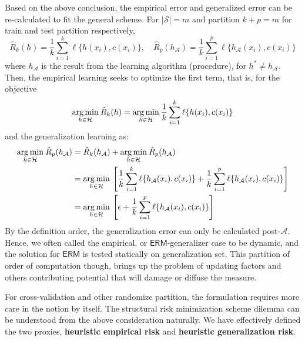 Based on the above conclusion, the empirical error and generalized error can be re-calculated to fit the general scheme. For $\lvert \mathcal{S}\rvert = m$ and partition $k+p=m$ for train and test partition respectively, 
\begin{equation}
    \hat{R}_{k}(h) = \frac{1}{k} \sum^{k}_{i=1} \ell\{h(x_{i}),c(x_{i})\},\quad \hat{R}_{p}(h_{\mathcal{A}}) = \frac{1}{k} \sum^{p}_{i=1} \ell\{h_{\mathcal{A}}(x_{i}),c(x_{i})\}
\end{equation}
where $h_{\mathcal{A}}$ is the result from the learning algorithm (procedure), for $h^{*}\neq h_{\mathcal{A}}$. Then, the empirical learning seeks to optimize the first term, that is, for the objective 
\begin{equation}
    \underset{h\in \mathcal{H}}{\operatorname*{arg\,min}}\: \hat{R}_{k}(h) = \underset{h\in \mathcal{H}}{\operatorname*{arg\,min}}\:\frac{1}{k} \sum^{k}_{i=1} \ell\{h(x_{i}),c(x_{i})\}
\end{equation}
and the generalization learning as: 
\begin{equation}
    \begin{split}
        \underset{h\in \mathcal{H}}{\operatorname*{arg\,min}}\: \hat{R}_{p}(h_{\mathcal{A}}) 
        & = \hat{R}_{k}(h_{\mathcal{A}}) + \underset{h\in \mathcal{H}}{\operatorname*{arg\,min}}\:\hat{R}_{p}(h_{\mathcal{A}})\\
        & =  \underset{h\in \mathcal{H}}{\operatorname*{arg\,min}}\: \left[\frac{1}{k} \sum^{k}_{i=1} \ell\{h_{\mathcal{A}}(x_{i}),c(x_{i})\} + \frac{1}{k} \sum^{p}_{i=1} \ell\{h_{\mathcal{A}}(x_{i}),c(x_{i})\}\right]\\
        & = \underset{h\in \mathcal{H}}{\operatorname*{arg\,min}}\: \left[\epsilon + \frac{1}{k} \sum^{p}_{i=1} \ell\{h_{\mathcal{A}}(x_{i}),c(x_{i})\}\right]
    \end{split}
\end{equation}
By the definition order, the generalization error can only be calculated post-$\mathcal{A}$. Hence, we often called the empirical, or $\mathsf{ERM}$-generalizer case to be dynamic, and the solution for $\mathsf{ERM}$ is tested statically on generalization set. This partition of order of computation though, brings up the problem of updating factors and others contributing potential that will damage or diffuse the measure. 

For cross-validation and other randomize partition, the formulation requires more care in the notion by itself. The structural risk minimization scheme dilemma can be understood from the above consideration naturally. We have effectively defined the two proxies, \textbf{heuristic empirical risk} and \textbf{heuristic generalization risk}. 

